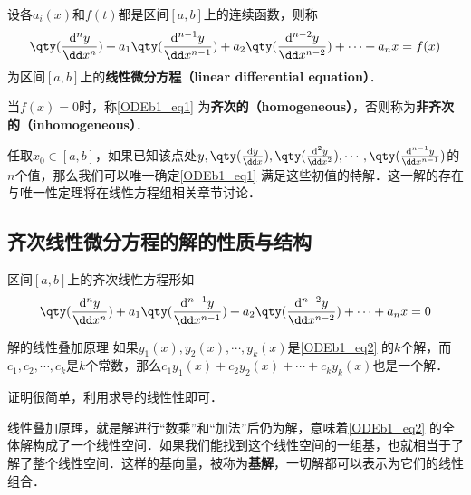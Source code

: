

\begin{definition}{}
设各$a_i(x)$和$f(t)$都是区间$[a, b]$上的连续函数，则称
\begin{equation}\label{ODEb1_eq1}
\qty(\frac{\mathrm{d}^n y}{\dd x^n})+a_1\qty(\frac{\mathrm{d}^{n-1} y}{\dd x^{n-1}})+a_2\qty(\frac{\mathrm{d}^{n-2} y}{\dd x^{n-2}})+\cdots+a_nx=f(x)
\end{equation}
为区间$[a, b]$上的\textbf{线性微分方程（linear differential equation）}．

当$f(x)=0$时，称\autoref{ODEb1_eq1} 为\textbf{齐次的（homogeneous）}，否则称为\textbf{非齐次的（inhomogeneous）}．
\end{definition}

任取$x_0\in[a, b]$，如果已知该点处$y, \qty(\frac{\mathrm{d} y}{\dd x}), \qty(\frac{\mathrm{d}^{2} y}{\dd x^{2}}), \cdots, \qty(\frac{\mathrm{d}^{n-1} y}{\dd x^{n-1}})$的$n$个值，那么我们可以唯一确定\autoref{ODEb1_eq1} 满足这些初值的特解．这一解的存在与唯一性定理将在线性方程组相关章节讨论．


\subsection{齐次线性微分方程的解的性质与结构}

区间$[a, b]$上的齐次线性方程形如
\begin{equation}\label{ODEb1_eq2}
\qty(\frac{\mathrm{d}^n y}{\dd x^n})+a_1\qty(\frac{\mathrm{d}^{n-1} y}{\dd x^{n-1}})+a_2\qty(\frac{\mathrm{d}^{n-2} y}{\dd x^{n-2}})+\cdots+a_nx=0
\end{equation}

\begin{theorem}{解的线性叠加原理}
如果$y_1(x), y_2(x), \cdots, y_k(x)$是\autoref{ODEb1_eq2} 的$k$个解，而$c_1, c_2, \cdots, c_k$是$k$个常数，那么$c_1y_1(x)+c_2y_2(x)+\cdots+c_ky_k(x)$也是一个解．
\end{theorem}

证明很简单，利用求导的线性性即可．

线性叠加原理，就是解进行“数乘”和“加法”后仍为解，意味着\autoref{ODEb1_eq2} 的全体解构成了一个线性空间．如果我们能找到这个线性空间的一组基，也就相当于了解了整个线性空间．这样的基向量，被称为\textbf{基解}，一切解都可以表示为它们的线性组合．

